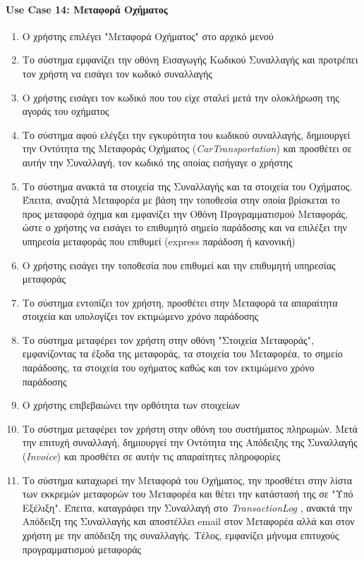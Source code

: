 \documentclass{../ol-softwaremanual}
\begin{document}
	
	
	\newpage
	\centering
	
	\paragraph{\en Use Case 14: \gr Μεταφορά Οχήματος}  
	\begin{enumerate}
		\item Ο χρήστης επιλέγει \en"\gr Μεταφορά Οχήματος\en" \gr στο αρχικό μενού
		\item Το σύστημα εμφανίζει την οθόνη Εισαγωγής Κωδικού Συναλλαγής και προτρέπει τον χρήστη να εισάγει τον κωδικό συναλλαγής
		\item Ο χρήστης εισάγει τον κωδικό που του είχε σταλεί μετά την ολοκλήρωση της αγοράς του οχήματος
		\item Το σύστημα αφού ελέγξει την εγκυρότητα του κωδικού συναλλαγής, δημιουργεί την Οντότητα της Μεταφοράς Οχήματος (\en\textit{CarTransportation}\gr) και προσθέτει σε αυτήν την Συναλλαγή, τον κωδικό της οποίας εισήγαγε ο χρήστης
		\item Το σύστημα ανακτά τα στοιχεία της Συναλλαγής και τα στοιχεία του Οχήματος. Έπειτα, αναζητά Μεταφορέα με βάση την τοποθεσία στην οποία βρίσκεται το προς μεταφορά όχημα και εμφανίζει την Οθόνη Προγραμματισμού Μεταφοράς, ώστε ο χρήστης να εισάγει το επιθυμητό σημείο παράδοσης και να επιλέξει την υπηρεσία μεταφοράς που επιθυμεί (\en express \gr παράδοση ή κανονική)		
		\item Ο χρήστης εισάγει την τοποθεσία που επιθυμεί και την επιθυμητή υπηρεσίας μεταφοράς
		\item Το σύστημα εντοπίζει τον χρήστη, προσθέτει στην Μεταφορά τα απαραίτητα στοιχεία και υπολογίζει τον εκτιμώμενο χρόνο παράδοσης
		\item Το σύστημα μεταφέρει τον χρήστη στην οθόνη \en"\gr Στοιχεία Μεταφοράς\en"\gr, εμφανίζοντας τα έξοδα της μεταφοράς, τα στοιχεία του Μεταφορέα, το σημείο παράδοσης, τα στοιχεία του οχήματος καθώς και τον εκτιμώμενο χρόνο παράδοσης 
		\item Ο χρήστης επιβεβαιώνει την ορθότητα των στοιχείων 				
		\item Το σύστημα μεταφέρει τον χρήστη στην οθόνη του συστήματος πληρωμών. Μετά την επιτυχή συναλλαγή, δημιουργεί την Οντότητα της Απόδειξης της Συναλλαγής (\en \textit{Invoice}\gr) και προσθέτει σε αυτήν τις απαραίτητες πληροφορίες  
		\item Το σύστημα καταχωρεί την Μεταφορά του Οχήματος, την προσθέτει στην λίστα των εκκρεμών μεταφορών του Μεταφορέα και θέτει την κατάστασή της σε \en"\gr Υπό Εξέλιξη\en"\gr. Έπειτα, καταγράφει την Συναλλαγή στο \en \textit{TransactionLog} \gr, ανακτά την Απόδειξη της Συναλλαγής και αποστέλλει \en email \gr στον Μεταφορέα αλλά και στον χρήστη με την απόδειξη της συναλλαγής. Τέλος, εμφανίζει μήνυμα επιτυχούς προγραμματισμού μεταφοράς
	\end{enumerate}
	
\end{document}
